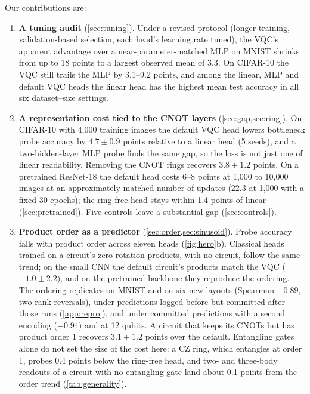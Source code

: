 

Our contributions are:
\begin{enumerate}
  \item \textbf{A tuning audit} (\cref{sec:tuning}). Under a revised protocol (longer
        training, validation-based selection, each head's learning rate tuned), the VQC's
        apparent advantage over a near-parameter-matched MLP on MNIST shrinks from up to 18
        points to a largest observed mean of 3.3. On CIFAR-10 the VQC still trails the MLP by 3.1--9.2 points,
        and among the linear, MLP and default VQC heads the linear head has the highest mean
        test accuracy in all six dataset--size settings.
  \item \textbf{A representation cost tied to the CNOT layers} (\cref{sec:gap,sec:ring}). On
        CIFAR-10 with 4,000 training images the default VQC head lowers bottleneck probe
        accuracy by $4.7\pm0.9$ points relative to a linear head (5 seeds), and a two-hidden-layer
        MLP probe finds the same gap, so the loss is not just one of linear readability. Removing the CNOT
        rings recovers $3.8\pm1.2$ points. On a pretrained ResNet-18 the default head costs
        6--8 points at 1,000 to 10,000 images at an approximately matched number of updates (22.3 at 1,000
        with a fixed 30 epochs); the ring-free head stays within 1.4 points of linear
        (\cref{sec:pretrained}). Five controls leave a substantial gap
        (\cref{sec:controls}).
  \item \textbf{Product order as a predictor} (\cref{sec:order,sec:sinusoid}). Probe accuracy falls
        with product order across eleven heads (\cref{fig:hero}b). Classical heads trained
        on a circuit's zero-rotation products, with no circuit, follow the same trend; on the
        small CNN the default circuit's products match the VQC ($-1.0\pm2.2$), and on the
        pretrained backbone they reproduce the ordering.
        The ordering replicates on MNIST and on six new layouts (Spearman $-0.89$, two rank reversals), under predictions logged
        before but committed after those runs (\cref{app:repro}), and under committed predictions with a second encoding ($-0.94$) and at 12 qubits. A circuit that keeps its CNOTs
        but has product order 1 recovers $3.1\pm1.2$ points over the default. Entangling gates alone do not set the size of the cost here: a CZ ring, which entangles at order 1, probes 0.4 points below the ring-free head, and two- and three-body readouts of a circuit with no entangling gate land about 0.1 points from the order trend (\cref{tab:generality}).

\end{enumerate}
